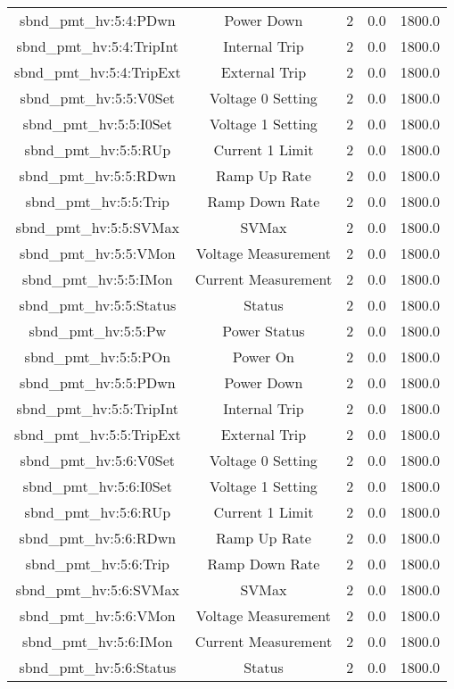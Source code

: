 \begin{center}
\begin{longtable}{c | c c c c }
sbnd\_pmt\_hv:5:4:PDwn & Power Down & 2 & 0.0 & 1800.0\\ 
sbnd\_pmt\_hv:5:4:TripInt & Internal Trip & 2 & 0.0 & 1800.0\\ 
sbnd\_pmt\_hv:5:4:TripExt & External Trip & 2 & 0.0 & 1800.0\\ 
sbnd\_pmt\_hv:5:5:V0Set & Voltage 0 Setting & 2 & 0.0 & 1800.0\\ 
sbnd\_pmt\_hv:5:5:I0Set & Voltage 1 Setting & 2 & 0.0 & 1800.0\\ 
sbnd\_pmt\_hv:5:5:RUp & Current 1 Limit & 2 & 0.0 & 1800.0\\ 
sbnd\_pmt\_hv:5:5:RDwn & Ramp Up Rate & 2 & 0.0 & 1800.0\\ 
sbnd\_pmt\_hv:5:5:Trip & Ramp Down Rate & 2 & 0.0 & 1800.0\\ 
sbnd\_pmt\_hv:5:5:SVMax & SVMax & 2 & 0.0 & 1800.0\\ 
sbnd\_pmt\_hv:5:5:VMon & Voltage Measurement & 2 & 0.0 & 1800.0\\ 
sbnd\_pmt\_hv:5:5:IMon & Current Measurement & 2 & 0.0 & 1800.0\\ 
sbnd\_pmt\_hv:5:5:Status & Status & 2 & 0.0 & 1800.0\\ 
sbnd\_pmt\_hv:5:5:Pw & Power Status & 2 & 0.0 & 1800.0\\ 
sbnd\_pmt\_hv:5:5:POn & Power On & 2 & 0.0 & 1800.0\\ 
sbnd\_pmt\_hv:5:5:PDwn & Power Down & 2 & 0.0 & 1800.0\\ 
sbnd\_pmt\_hv:5:5:TripInt & Internal Trip & 2 & 0.0 & 1800.0\\ 
sbnd\_pmt\_hv:5:5:TripExt & External Trip & 2 & 0.0 & 1800.0\\ 
sbnd\_pmt\_hv:5:6:V0Set & Voltage 0 Setting & 2 & 0.0 & 1800.0\\ 
sbnd\_pmt\_hv:5:6:I0Set & Voltage 1 Setting & 2 & 0.0 & 1800.0\\ 
sbnd\_pmt\_hv:5:6:RUp & Current 1 Limit & 2 & 0.0 & 1800.0\\ 
sbnd\_pmt\_hv:5:6:RDwn & Ramp Up Rate & 2 & 0.0 & 1800.0\\ 
sbnd\_pmt\_hv:5:6:Trip & Ramp Down Rate & 2 & 0.0 & 1800.0\\ 
sbnd\_pmt\_hv:5:6:SVMax & SVMax & 2 & 0.0 & 1800.0\\ 
sbnd\_pmt\_hv:5:6:VMon & Voltage Measurement & 2 & 0.0 & 1800.0\\ 
sbnd\_pmt\_hv:5:6:IMon & Current Measurement & 2 & 0.0 & 1800.0\\ 
sbnd\_pmt\_hv:5:6:Status & Status & 2 & 0.0 & 1800.0\\ 

\end{longtable}
\end{center}

